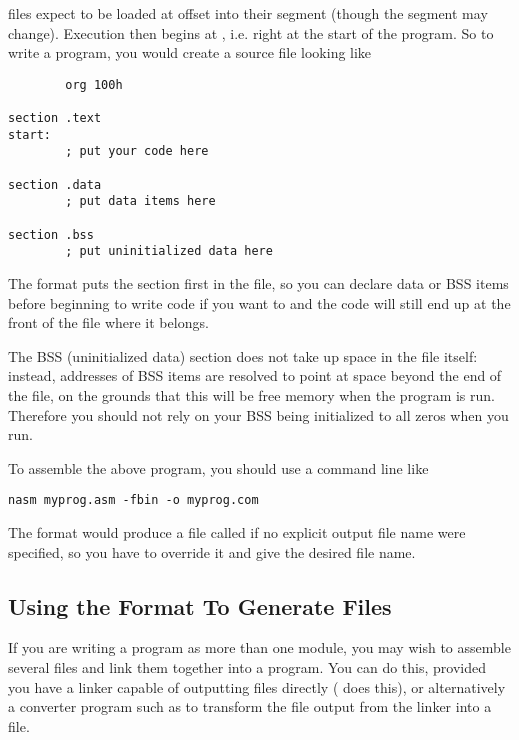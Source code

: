  files expect to be loaded at offset  into their
segment (though the segment may change). Execution then begins at
, i.e. right at the start of the program.
So to write a  program, you would create a source file
looking like

\begin{lstlisting}
        org 100h

section .text
start:
        ; put your code here

section .data
        ; put data items here

section .bss
        ; put uninitialized data here
\end{lstlisting}

The  format puts the  section first in the file,
so you can declare data or BSS items before beginning to write code if
you want to and the code will still end up at the front of the file
where it belongs.

The BSS (uninitialized data) section does not take up space in the
 file itself: instead, addresses of BSS items are resolved
to point at space beyond the end of the file, on the grounds that
this will be free memory when the program is run. Therefore you
should not rely on your BSS being initialized to all zeros when you
run.

To assemble the above program, you should use a command line like

\begin{lstlisting}
nasm myprog.asm -fbin -o myprog.com
\end{lstlisting}

The  format would produce a file called  if no
explicit output file name were specified, so you have to override it
and give the desired file name.

\subsection{Using the  Format To Generate  Files}
\label{subsec:comobjfmt}

If you are writing a  program as more than one module, you
may wish to assemble several  files and link them together
into a  program. You can do this, provided you have a linker
capable of outputting  files directly ( does this),
or alternatively a converter program such as  to
transform the  file output from the linker into a 
file.

